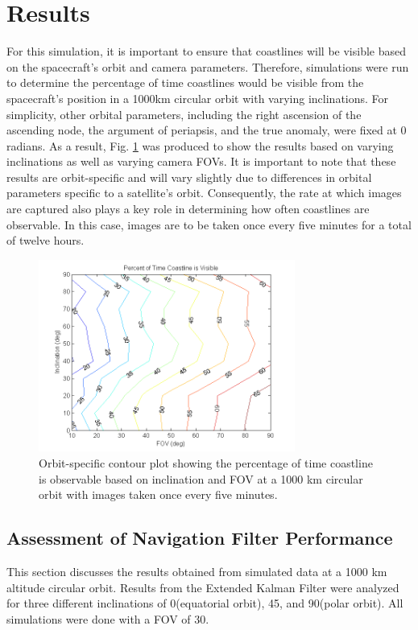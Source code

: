\documentclass[]{aiaa-tc}%
\begin{document}
\section{Results}
For this simulation, it is important to ensure that coastlines will be visible based on the spacecraft's orbit and camera parameters.  Therefore, simulations were run to determine the percentage of time coastlines would be visible from the spacecraft's position in a 1000km circular orbit with varying inclinations.  For simplicity, other orbital parameters, including the right ascension of the ascending node, the argument of periapsis, and the true anomaly, were fixed at 0 radians.  As a result, Fig. \ref{fig:contourplot} was produced to show the results based on varying inclinations as well as varying camera FOVs.  It is important to note that these results are orbit-specific and will vary slightly due to differences in orbital parameters specific to a satellite's orbit. Consequently, the rate at which images are captured also plays a key role in determining how often coastlines are observable.  In this case, images are to be taken once every five minutes for a total of twelve hours.  
\begin{figure}[ht!]
\centering
\includegraphics[width=0.75\textwidth]{contourplot} %
\caption{Orbit-specific contour plot showing the percentage of time coastline is observable based on inclination and FOV at a 1000 km circular orbit with images taken once every five minutes.}
\label{fig:contourplot}
\end{figure}

\subsection{Assessment of Navigation Filter Performance}
This section discusses the results obtained from simulated data at a 1000 km altitude circular orbit.  Results from the Extended Kalman Filter were analyzed for three different inclinations of 0\degree (equatorial orbit), 45\degree, and 90\degree (polar orbit).  All simulations were done with a FOV of 30\degree.
\end{document}
